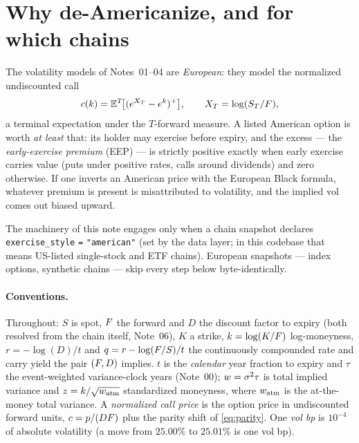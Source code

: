 \documentclass[11pt]{article}
\begin{document}
\tableofcontents
\newpage

\section{Why de-Americanize, and for which chains}
\label{sec:why}

The volatility models of Notes~01--04 are \emph{European}: they model the
normalized undiscounted call
\begin{equation}
c(k)=\mathbb{E}^{T}\!\big[(e^{X_T}-e^{k})^+\big],\qquad
X_T=\log(S_T/F),
\label{eq:normcall}
\end{equation}
a terminal expectation under the $T$-forward measure. A listed American option is
worth \emph{at least} that: its holder may exercise before expiry, and the excess
--- the \emph{early-exercise premium} (EEP) --- is strictly positive exactly when
early exercise carries value (puts under positive rates, calls around dividends)
and zero otherwise. If one inverts an American price with the European Black
formula, whatever premium is present is misattributed to volatility, and the
implied vol comes out biased upward.

The machinery of this note engages only when a chain snapshot declares
\texttt{exercise\_style} \texttt{=} \texttt{"american"} (set by the data layer; in
this codebase that means US-listed single-stock and ETF chains). European
snapshots --- index options, synthetic chains --- skip every step below
byte-identically.

\paragraph{Conventions.}
Throughout: $S$ is spot, $F$ the forward and $D$ the discount factor to expiry
(both resolved from the chain itself, Note~06), $K$ a strike,
$k=\log(K/F)$ log-moneyness, $r=-\log(D)/t$ and
$q=r-\log(F/S)/t$ the continuously compounded rate and carry yield the pair
$(F,D)$ implies. $t$ is the \emph{calendar} year fraction to expiry and $\tau$
the event-weighted variance-clock years (Note~00); $w=\sigma^2\tau$ is total
implied variance and $z=k/\sqrt{w_{\mathrm{atm}}}$ standardized moneyness, where
$w_{\mathrm{atm}}$ is the at-the-money total variance. A \emph{normalized call price}
is the option price in undiscounted forward units, $c=p/(DF)$ plus the parity
shift of \cref{eq:parity}. One \emph{vol bp} is $10^{-4}$ of absolute volatility
(a move from $25.00\%$ to $25.01\%$ is one vol bp).
\end{document}
